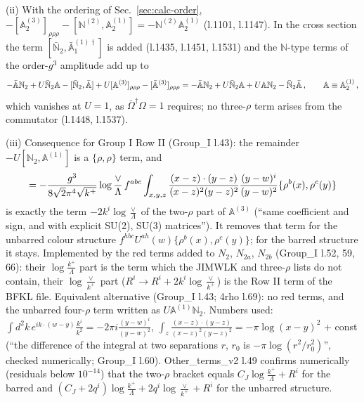 \documentclass[10pt]{article}
\def\mf#1{\mathbb{#1}}
\begin{document}
\noindent (ii) With the ordering of Sec.~\ref{sec:calc-order}, $-[\mf{A}^{(3)}_{2}]_{\rho\rho\rho}-[\mf{N}^{(2)},\mf{A}^{(1)}_{2}]=-\mf{N}^{(2)}\mf{A}^{(1)}_{2}$ (l.1101, l.1147). In the cross section the term $[\bar{\mf{N}}_{2},\bar{\mf{A}}^{(1)\dagger}_{1}]$ is added (l.1435, l.1451, l.1531) and the $\mf{N}$-type terms of the order-$g^{3}$ amplitude add up to
\begin{align}
-\bar{\mf{A}}\mf{N}_{2}+U\bar{\mf{N}}_{2}\mf{A}-[\bar{\mf{N}}_{2},\bar{\mf{A}}]+U[\mf{A}^{(3)}]_{\rho\rho\rho}-[\bar{\mf{A}}^{(3)}]_{\rho\rho\rho}=-\bar{\mf{A}}\mf{N}_{2}+U\bar{\mf{N}}_{2}\mf{A}+U\mf{A}\mf{N}_{2}-\bar{\mf{N}}_{2}\bar{\mf{A}}\,,\qquad\mf{A}\equiv\mf{A}^{(1)}_{2}\,,\notag
\end{align}
which vanishes at $U=1$, as $\bar\Omega^{\dagger}\Omega=1$ requires; no three-$\rho$ term arises from the commutator (l.1448, l.1537).

\noindent (iii) Consequence for Group I Row II (Group\_I l.43): the remainder $-U[\mf{N}_{2},\mf{A}^{(1)}]$ is a $\{\rho,\rho\}$ term, and
\begin{align}
[\mf{N}_{2},\mf{A}^{(1)a}_{i}(k^{+},-w)]=-\frac{g^{3}}{8\sqrt{2}\pi^{4}\sqrt{k^{+}}}\log\frac{\vee}{\Lambda}\,f^{abc}\int_{x,y,z}\frac{(x-z)\cdot(y-z)}{(x-z)^{2}(y-z)^{2}}\frac{(y-w)^{i}}{(y-w)^{2}}\{\rho^{b}(x),\rho^{c}(y)\}\notag
\end{align}
is exactly the term $-2k^{i}\log\frac{\vee}{\Lambda}$ of the two-$\rho$ part of $\mf{A}^{(3)}$ (``same coefficient and sign, and with explicit SU(2), SU(3) matrices''). It removes that term for the unbarred colour structure $f^{hbc}U^{ah}(w)\{\rho^{b}(x),\rho^{c}(y)\}$; for the barred structure it stays. Implemented by the red terms added to $N_{2}$, $N_{2a}$, $N_{2b}$ (Group\_I l.52, 59, 66): their $\log\frac{k^{+}}{\Lambda}$ part is the term which the JIMWLK and three-$\rho$ lists do not contain, their $\log\frac{\vee}{k^{+}}$ part ($R^{i}\to R^{i}+2k^{i}\log\frac{\vee}{k^{+}}$) is the Row II term of the BFKL file. Equivalent alternative (Group\_I l.43; 4rho l.69): no red terms, and the unbarred four-$\rho$ term written as $U\mf{A}^{(1)}\mf{N}_{2}$. Numbers used: $\int d^{2}k\,e^{ik\cdot(w-y)}\frac{k^{i}}{k^{2}}=-2\pi i\frac{(y-w)^{i}}{(y-w)^{2}}$, $\int_{z}\frac{(x-z)\cdot(y-z)}{(x-z)^{2}(y-z)^{2}}=-\pi\log(x-y)^{2}$ + const (``the difference of the integral at two separations $r$, $r_{0}$ is $-\pi\log(r^{2}/r_{0}^{2})$'', checked numerically; Group\_I l.60). Other\_terms\_v2 l.49 confirms numerically (residuals below $10^{-14}$) that the two-$\rho$ bracket equals $C_{J}\log\frac{k^{+}}{\Lambda}+R^{i}$ for the barred and $(C_{J}+2q^{i})\log\frac{k^{+}}{\Lambda}+2q^{i}\log\frac{\vee}{k^{+}}+R^{i}$ for the unbarred structure.
\end{document}
